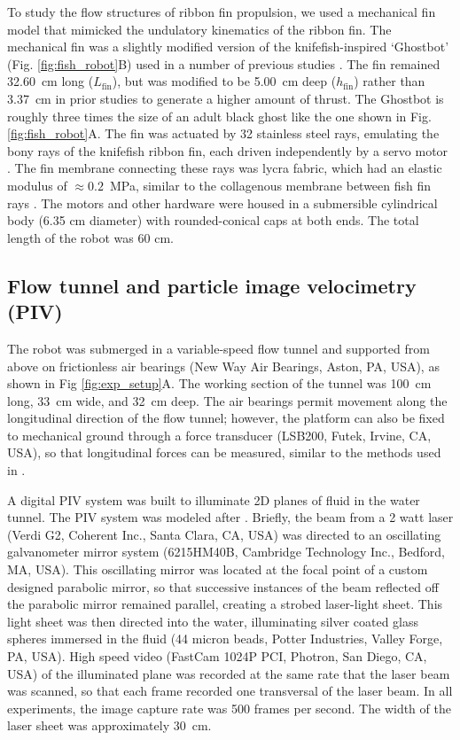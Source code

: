 \documentclass[onecolumn]{IEEEtran}
\begin{document}
To study the flow structures of ribbon fin propulsion, we used a
mechanical fin model that mimicked the undulatory kinematics of the
ribbon fin. The mechanical fin was a slightly modified version of the
knifefish-inspired `Ghostbot' (Fig. \ref{fig:fish_robot}B) used in a
number of previous studies \citep*{Cure11a,Cure11b,Sefa12a}. The fin
remained 32.60~cm long ($L_\text{fin}$), but was modified to be 5.00~cm
deep ($h_\text{fin}$) rather than 3.37~cm in prior studies to generate a higher amount of thrust.  
The Ghostbot is roughly three times the size of an adult black 
ghost like the one shown in Fig. \ref{fig:fish_robot}A. The fin was
actuated by 32 stainless steel rays, emulating the bony rays of the
knifefish ribbon fin, each driven independently by a servo motor
\citep*{Cure11a}. The fin membrane connecting these rays was
lycra fabric, which had an elastic modulus of $\approx 0.2$~MPa,
similar to the collagenous membrane between fish fin rays \citep*{Laud06b}.
The motors and other hardware were housed in a submersible cylindrical
body (6.35 cm diameter) with rounded-conical caps at both ends. The total
length of the robot was 60 cm.

\subsection{Flow tunnel and particle image velocimetry (PIV)}

The robot was submerged in a variable-speed flow tunnel and supported from
above on frictionless air bearings (New Way Air Bearings, Aston, PA, USA),
as shown in Fig \ref{fig:exp_setup}A. The working section of the tunnel
was 100~cm long, 33~cm wide, and 32~cm deep. The air bearings permit
movement along the longitudinal direction of the flow tunnel; however, the
platform can also be fixed to mechanical ground through a force transducer
(LSB200, Futek, Irvine, CA, USA), so that longitudinal forces can be
measured, similar to the methods used in \citep*{Cure11a}.

A digital PIV system was built to illuminate 2D planes of fluid in the water
tunnel. The PIV system was modeled after \citep*{Schl07a}. Briefly, the beam
from a 2 watt laser (Verdi G2, Coherent Inc., Santa Clara, CA, USA) was
directed to an oscillating galvanometer mirror system (6215HM40B,
Cambridge Technology Inc., Bedford, MA, USA). This oscillating mirror was located at
the focal point of a custom designed parabolic mirror, so that successive instances of the
beam reflected off the parabolic mirror remained parallel, creating a strobed laser-light sheet.
This light sheet was then directed into the water, illuminating silver
coated glass spheres immersed in the fluid (44 micron beads, Potter
Industries, Valley Forge, PA, USA). High speed video (FastCam 1024P PCI,
Photron, San Diego, CA, USA) of the illuminated plane was recorded at the
same rate that the laser beam was scanned, so that each frame recorded one
transversal of the laser beam. In all experiments, the image capture rate was 500
frames per second.  The width of the laser sheet was approximately 30~cm.
\end{document}
